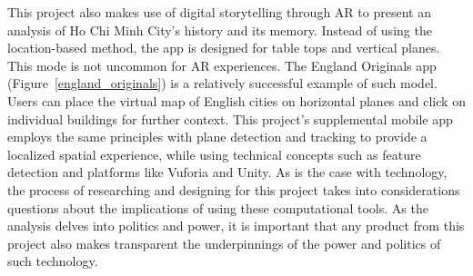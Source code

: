 \begin{figure}[!ht]
\end{figure}

\begin{figure}[!ht]
\end{figure}

This project also makes use of digital storytelling through AR to present an analysis of Ho Chi Minh City's history and its memory. Instead of using the location-based method, the app is designed for table tops and vertical planes. This mode is not uncommon for AR experiences. The England Originals app (Figure~\ref{england_originals}) is a relatively successful example of such model. Users can place the virtual map of English cities on horizontal planes and click on individual buildings for further context. This project's supplemental mobile app employs the same principles with plane detection and tracking to provide a localized spatial experience, while using technical concepts such as feature detection and platforms like Vuforia and Unity. As is the case with technology, the process of researching and designing for this project takes into considerations questions about the implications of using these computational tools. As the analysis delves into politics and power, it is important that any product from this project also makes transparent the underpinnings of the power and politics of such technology.

